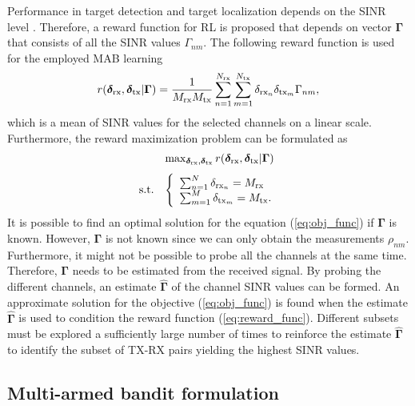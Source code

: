\documentclass[english, 12pt, a4paper, elec, utf8, a-1b, online]{aaltothesis}
\newcommand{\esinrexp}{\Gamma_{nm}}
\newcommand{\vsinrexp}{\boldsymbol{\Gamma}}
\newcommand{\vsinrb}{\widehat{\boldsymbol{\Gamma}}}
\newcommand{\easvtx}{\delta_{\text{tx}_m}}
\newcommand{\vasvtx}{\boldsymbol{\delta}_{\text{tx}}}
\newcommand{\easvrx}{\delta_{\text{rx}_n}}
\newcommand{\vasvrx}{\boldsymbol{\delta}_{\text{rx}}}
\newcommand{\esp}{\rho_{nm}}
\begin{document}
Performance in target detection and target localization depends on the SINR level \cite{Aittomäki2011, Godrich2011, Sun2014}.
Therefore, a reward function for RL is proposed that depends on vector $\vsinrexp$ that consists of all the SINR values $\esinrexp$.
The following reward function is used for the employed MAB learning
\begin{equation}\label{eq:reward_func}
    r(\vasvrx, \vasvtx | \vsinrexp) = \frac{1}{\srx \stx}\sum_{n=1}^\nrx \sum_{m=1}^\ntx  \easvrx \easvtx \esinrexp,
\end{equation}
which is a mean of SINR values for the selected channels on a linear scale.
Furthermore, the reward maximization problem can be formulated as
\begin{equation}\label{eq:obj_func}
    \begin{array}{ll}
                &   \max_{\vasvrx, \vasvtx} r(\vasvrx, \vasvtx | \vsinrexp) \\[7pt]
    \text{s.t.} &   
                \left\{\begin{array}{l}
                    \sum_{n=1}^N \easvrx = \srx \\
                    \sum_{m=1}^M \easvtx = \stx.
                \end{array}\right.
    \end{array}
\end{equation}
It is possible to find an optimal solution for the equation (\ref{eq:obj_func}) if $\vsinrexp$ is known.
However, $\vsinrexp$ is not known since we can only obtain the measurements $\esp$. 
Furthermore, it might not be possible to probe all the channels at the same time.
Therefore, $\vsinrexp$ needs to be estimated from the received signal. 
By probing the different channels, an estimate $\vsinrb$ of the channel SINR values can be formed.
An approximate solution for the objective (\ref{eq:obj_func}) is found when the estimate $\vsinrb$ is used to condition the reward function (\ref{eq:reward_func}).
Different subsets must be explored a sufficiently large number of times to reinforce the estimate $\vsinrb$ to identify the subset of TX-RX pairs yielding the highest SINR values.


\subsection{Multi-armed bandit formulation}
\end{document}
